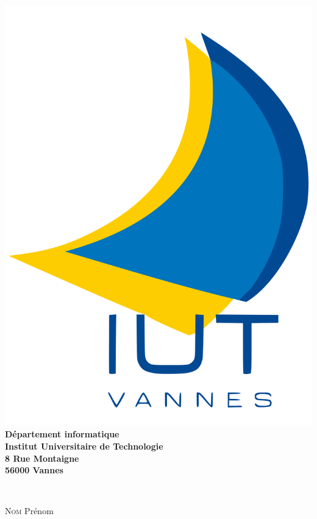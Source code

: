 \documentclass[french]{report}
\begin{document}
    \begin{titlepage}
    
    \begin{minipage}{0.5\textwidth}
        \begin{flushleft}
            \includegraphics[scale=0.13]{Images/1200px-Logo_IUT_Vannes.svg.png}\\[0.5cm]
            \large{\textbf{Département informatique \\
            Institut Universitaire de Technologie\\
            8 Rue Montaigne\\
            56000 Vannes \\
            }}
        \end{flushleft}
    \end{minipage}
    ~
    \begin{minipage}{0.5\textwidth}
        \begin{flushright} \large
            \LARGE{\textsc{Nom} Prénom}
        \end{flushright}
    \end{minipage}\\


\end{titlepage}
\end{document}
